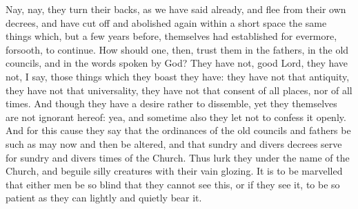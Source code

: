 Nay, nay, they turn their backs, as we have said already, and flee
from their own decrees, and have cut off and abolished again within
a short space the same things which, but a few years before, themselves
had established for evermore, forsooth, to continue. How should
one, then, trust them in the fathers, in the old councils, and in the
words spoken by God? They have not, good Lord, they have not,
I say, those things which they boast they have: they have not that antiquity,
they have not that universality, they have not
that consent of all places, nor of all times. And though they
have a desire rather to dissemble, yet they themselves are not ignorant
hereof: yea, and sometime also they let not to confess it openly.
And for this cause they say that the ordinances of the old councils
and fathers be such as may now and then be altered, and that sundry
and divers decrees serve for sundry and divers times of the Church.
Thus lurk they under the name of the Church, and beguile silly creatures
with their vain glozing. It is to be marvelled that either men
be so blind that they cannot see this, or if they see it, to be so patient
as they can lightly and quietly bear it.

